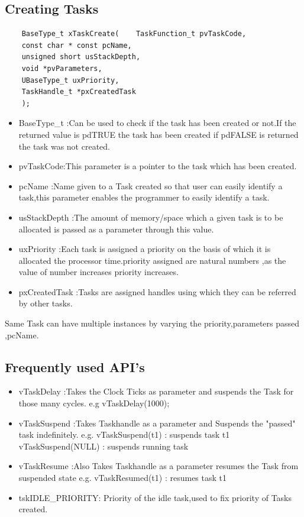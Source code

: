 \documentclass[11pt,a4paper]{article}
\begin{document}
	\subsection{Creating Tasks}
	
	\begin{lstlisting}
	BaseType_t xTaskCreate(    TaskFunction_t pvTaskCode,
	const char * const pcName,
	unsigned short usStackDepth,
	void *pvParameters,
	UBaseType_t uxPriority,
	TaskHandle_t *pxCreatedTask
	);
	\end{lstlisting}
	
	\begin{itemize}
		\item BaseType\_t :Can be used to check if the task has been created or not.If the returned value is pdTRUE the task has been created if pdFALSE is returned the task was not created.
		
		\item  pvTaskCode:This parameter is a pointer to the task which has been created.
		
		\item pcName :Name given to a Task created so that user can easily identify a task,this parameter enables the programmer to easily identify a task.
		
		\item usStackDepth :The amount of memory/space which a given task is to be allocated is passed as a parameter through this value.
		
		\item uxPriority :Each task is assigned a priority on the basis of which it is allocated the processor time.priority assigned are natural numbers ,as the value of number increases priority increases.
		
		\item pxCreatedTask :Tasks are assigned handles using which they can be referred by other tasks. 
	\end{itemize}
	 
	 Same Task can have multiple instances by varying the priority,parameters passed ,pcName.
	
	\subsection{Frequently used API's}
	\begin{itemize}
		\item vTaskDelay :Takes the Clock Ticks as parameter and suspends the Task for those many cycles. e.g vTaskDelay(1000);
		
		\item vTaskSuspend :Takes Taskhandle as a parameter and Suspends the "passed" task indefinitely.
		e.g. vTaskSuspend(t1) : suspends task t1 
		     vTaskSuspend(NULL) : suspends running task
		
		\item vTaskResume :Also Takes Taskhandle as a parameter resumes the Task from suspended state
		e.g. vTaskResumed(t1) : resumes task t1 
		
		\item tskIDLE\_PRIORITY: Priority of the idle task,used to fix priority of Tasks created.
		     
	\end{itemize}
	\newpage
\end{document}
